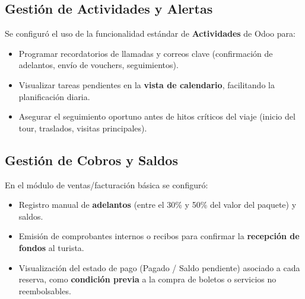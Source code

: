 \subsection{Gestión de Actividades y Alertas}

Se configuró el uso de la funcionalidad estándar de \textbf{Actividades} de Odoo para:

\begin{itemize}
    \item Programar recordatorios de llamadas y correos clave (confirmación de adelantos, envío de vouchers, seguimientos).
    \item Visualizar tareas pendientes en la \textbf{vista de calendario}, facilitando la planificación diaria.
    \item Asegurar el seguimiento oportuno antes de hitos críticos del viaje (inicio del tour, traslados, visitas principales).
\end{itemize}

\subsection{Gestión de Cobros y Saldos}

En el módulo de ventas/facturación básica se configuró:

\begin{itemize}
    \item Registro manual de \textbf{adelantos} (entre el 30\% y 50\% del valor del paquete) y saldos.
    \item Emisión de comprobantes internos o recibos para confirmar la \textbf{recepción de fondos} al turista.
    \item Visualización del estado de pago (Pagado / Saldo pendiente) asociado a cada reserva, como \textbf{condición previa} a la compra de boletos o servicios no reembolsables.
\end{itemize}

